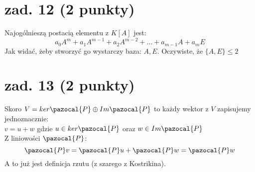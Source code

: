 \documentclass{article}
\begin{document}
\section{zad. 12 (2 punkty)}
Najogólnieszą postacią elementu z $K[A]$ jest:
$$
a_0 A^m + a_1 A^{m-1} +a_2 A^{m-2} + \dots + a_{m-1}A + a_mE
$$
Jak widać, żeby stworzyć go wystarczy baza: ${A,E}$. Oczywiste, że $\{A,E\} \leq 2$

\section{zad. 13 (2 punkty)}
Skoro $V = ker \pazocal{P} \oplus Im \pazocal{P}$ to każdy wektor z $V$ zapisujemy jednoznacznie:\\
$v = u + w$ gdzie $u \in ker \pazocal{P}$ oraz $w \in Im \pazocal{P}$\\
Z liniowości $\pazocal{P}$:\\
$$
\pazocal{P}v = \pazocal{P}u + \pazocal{P}w = \pazocal{P}w
$$
A to już jest definicja rzutu (z szarego z Kostrikina).
\end{document}
